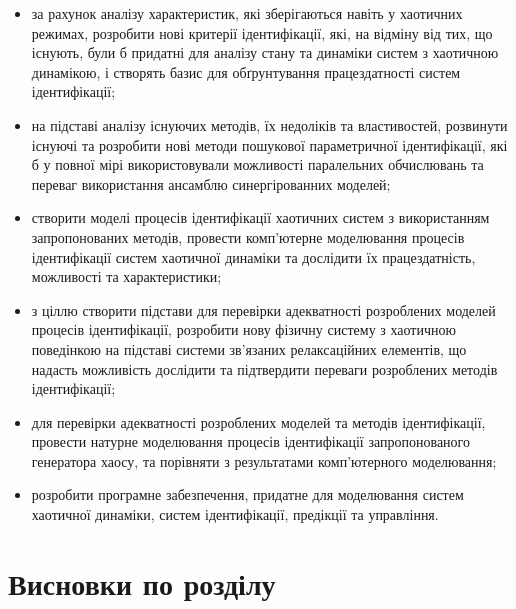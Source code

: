 \begin{itemize}

  \item
    за рахунок аналізу характеристик, які зберігаються навіть
    у хаотичних режимах,
    розробити нові критерії ідентифікації, які, на відміну від тих, що
    існують, були б придатні для аналізу стану та динаміки
    систем з хаотичною динамікою, і створять базис для обґрунтування працездатності систем
    ідентифікації;

  \item
    на підставі аналізу існуючих методів, їх недоліків та властивостей,
    розвинути існуючі та розробити нові методи пошукової параметричної ідентифікації,
    які б у повної мірі використовували можливості
    паралельних обчислювань та переваг використання ансамблю
    синергірованних моделей;


  \item
    створити моделі процесів
    ідентифікації хаотичних систем з використанням запропонованих методів,
    провести комп'ютерне моделювання процесів ідентифікації систем
    хаотичної динаміки та дослідити їх працездатність, можливості та
    характеристики;

  \item
    з ціллю створити підстави для перевірки адекватності розроблених
    моделей процесів ідентифікації,
    розробити нову фізичну систему з хаотичною поведінкою
    на підставі системи зв'язаних релаксаційних елементів,
    що надасть можливість дослідити та підтвердити переваги
    розроблених методів ідентифікації;

  \item
    для перевірки адекватності розроблених моделей та методів ідентифікації,
    провести натурне моделювання процесів ідентифікації запропонованого
    генератора хаосу, та порівняти з результатами комп'ютерного моделювання;

  \item
    розробити програмне забезпечення, придатне для моделювання систем
    хаотичної динаміки, систем ідентифікації, предікції та управління.

\end{itemize}




\section{Висновки по розділу \thechapter}%


